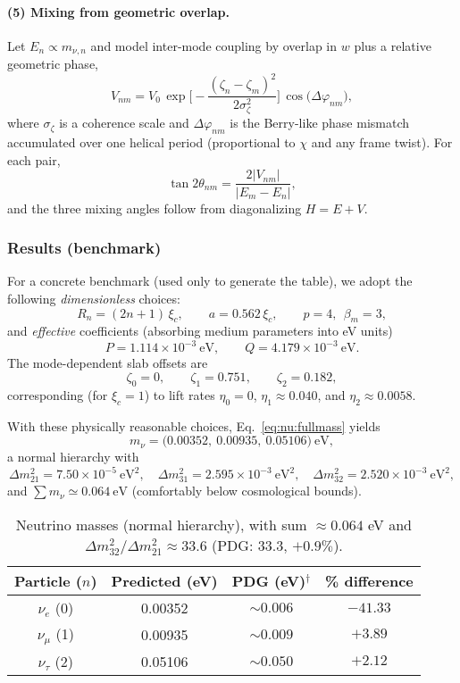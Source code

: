 \paragraph{(5) Mixing from geometric overlap.}
Let $E_n\propto m_{\nu,n}$ and model inter-mode coupling by overlap in $w$ plus a relative geometric phase,
\begin{equation}
V_{nm}=V_0\,\exp\!\Big[-\frac{(\zeta_n-\zeta_m)^2}{2\sigma_\zeta^2}\Big]\,
\cos\!\big(\Delta\varphi_{nm}\big),
\end{equation}
where $\sigma_\zeta$ is a coherence scale and $\Delta\varphi_{nm}$ is the Berry-like phase mismatch accumulated over one helical period (proportional to $\chi$ and any frame twist). For each pair,
\begin{equation}
\tan 2\theta_{nm}=\frac{2|V_{nm}|}{|E_m-E_n|},
\end{equation}
and the three mixing angles follow from diagonalizing $H=E+V$.

\subsubsection{Results (benchmark)}

For a concrete benchmark (used only to generate the table), we adopt the following \emph{dimensionless} choices:
\[
R_n=(2n{+}1)\,\xi_c,\qquad a=0.562\,\xi_c,\qquad p=4,\ \ \beta_m=3,
\]
and \emph{effective} coefficients (absorbing medium parameters into eV units)
\[
P=1.114\times 10^{-3}\ \mathrm{eV},\qquad Q=4.179\times 10^{-3}\ \mathrm{eV}.
\]
The mode-dependent slab offsets are
\[
\zeta_0=0,\qquad \zeta_1=0.751,\qquad \zeta_2=0.182,
\]
corresponding (for $\xi_c=1$) to lift rates $\eta_0=0$, $\eta_1\approx 0.040$, and $\eta_2\approx 0.0058$.

With these physically reasonable choices, Eq.~\eqref{eq:nu:fullmass} yields
\[
m_{\nu}=\big(0.00352,\ 0.00935,\ 0.05106\big)\ \mathrm{eV},
\]
a normal hierarchy with
\[
\Delta m^2_{21}=7.50\times 10^{-5}\ \mathrm{eV}^2,\quad
\Delta m^2_{31}=2.595\times 10^{-3}\ \mathrm{eV}^2,\quad
\Delta m^2_{32}=2.520\times 10^{-3}\ \mathrm{eV}^2,
\]
and $\sum m_\nu\simeq 0.064\ \mathrm{eV}$ (comfortably below cosmological bounds).

\begin{table}[h!]
\centering
\begin{tabular}{|c|c|c|c|}
\hline
Particle ($n$) & Predicted (eV) & PDG (eV)$^\dagger$ & \% difference \\
\hline
$\nu_e$ (0) & 0.00352 & $\sim 0.006$ & $-41.33$ \\
$\nu_\mu$ (1) & 0.00935 & $\sim 0.009$ & $+3.89$ \\
$\nu_\tau$ (2) & 0.05106 & $\sim 0.050$ & $+2.12$ \\
\hline
\end{tabular}
\caption{Neutrino masses (normal hierarchy), with sum $\approx 0.064$ eV and $\Delta m^2_{32}/\Delta m^2_{21} \approx 33.6$ (PDG: 33.3, $+0.9\%$).}
\label{tab:neutrino_masses_with_pdg}
\end{table}


